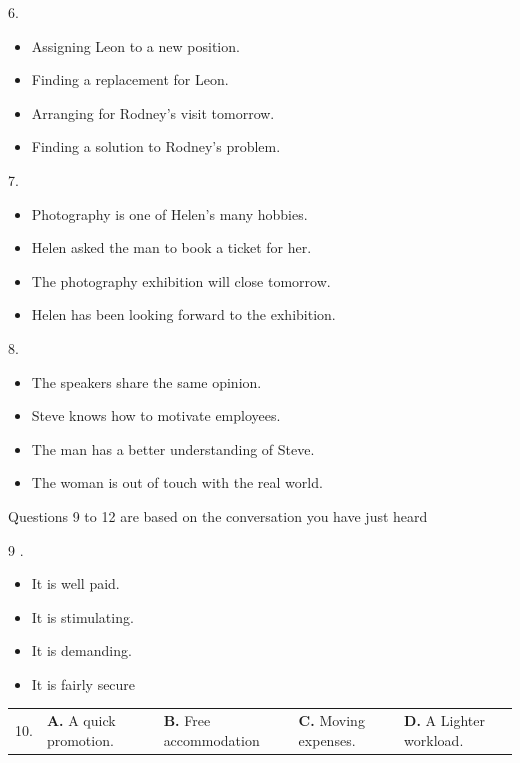 \documentclass[UTF8,11pt]{ctexart}
\begin{document}
6.


\begin{itemize}[leftmargin=2em,itemsep=.2em,topsep=.4em]\item[A.] Assigning Leon to a new position.
\item[B.] Finding a replacement for Leon.
\item[C.] Arranging for Rodney’s visit tomorrow.
\item[D.] Finding a solution to Rodney’s problem.
\end{itemize}

7.


\begin{itemize}[leftmargin=2em,itemsep=.2em,topsep=.4em]\item[A.] Photography is one of Helen’s many hobbies.
\item[B.] Helen asked the man to book a ticket for her.
\item[C.] The photography exhibition will close tomorrow.
\item[D.] Helen has been looking forward to the exhibition.
\end{itemize}

8.


\begin{itemize}[leftmargin=2em,itemsep=.2em,topsep=.4em]\item[A.] The speakers share the same opinion.
\item[B.] Steve knows how to motivate employees.
\item[C.] The man has a better understanding of Steve.
\item[D.] The woman is out of touch with the real world.
\end{itemize}

Questions 9 to 12 are based on the conversation you have just heard


9 .


\begin{itemize}[leftmargin=2em,itemsep=.2em,topsep=.4em]\item[A.] It is well paid.
\item[B.] It is stimulating.
\item[C.] It is demanding.
\item[D.] It is fairly secure
\end{itemize}

\noindent\begin{tabularx}{\linewidth}{@{}lXXXX@{}}10. & \textbf{A.} A quick promotion. & \textbf{B.} Free accommodation & \textbf{C.} Moving expenses. & \textbf{D.} A Lighter workload.\\\end{tabularx}\par
\end{document}
